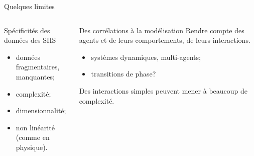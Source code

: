 \documentclass[ignorenonframetext]{beamer}
\begin{document}
\begin{frame}{Quelques limites}
	\begin{columns}
		\begin{column}{0.5\textwidth}
			\begin{block}{Spécificités des données des SHS}
				\begin{itemize}
					\item données fragmentaires, manquantes;
					\item complexité;
					\item dimensionnalité;
					\item non linéarité (comme en physique).
				\end{itemize}
			\end{block}
		\end{column}
		\begin{column}{0.5\textwidth}
			\begin{block}{Des corrélations à la modélisation}
				Rendre compte des agents et de leurs comportements, de leurs interactions.
			\begin{itemize}
				\item systèmes dynamiques, multi-agents;
				\item transitions de phase?
			\end{itemize}
		Des interactions simples peuvent mener à beaucoup de complexité.
			\end{block}
		\end{column}
	\end{columns}
\end{frame}
\end{document}
